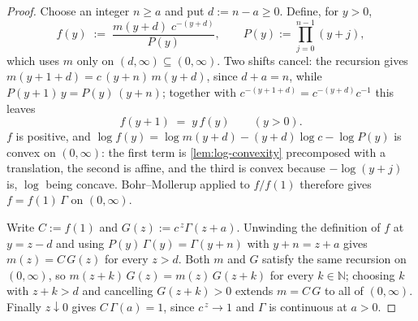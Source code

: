 \begin{proof}
\leanok
Choose an integer $n \ge a$ and put $d := n - a \ge 0$. Define, for $y > 0$,
\[
  f(y) \;:=\; \frac{m(y + d)\; c^{-(y+d)}}{P(y)},
  \qquad P(y) := \prod_{j=0}^{n-1}(y + j),
\]
which uses $m$ only on $(d, \infty) \subseteq (0,\infty)$. Two shifts cancel: the recursion gives
$m(y + 1 + d) = c\,(y + n)\,m(y+d)$, since $d + a = n$, while $P(y+1)\,y = P(y)\,(y+n)$; together
with $c^{-(y+1+d)} = c^{-(y+d)}c^{-1}$ this leaves
\[
  f(y+1) \;=\; y\,f(y) \qquad (y > 0).
\]
$f$ is positive, and $\log f(y) = \log m(y+d) - (y+d)\log c - \log P(y)$ is convex on $(0,\infty)$:
the first term is \ref{lem:log-convexity} precomposed with a translation, the second is affine, and
the third is convex because $-\log(y+j)$ is, $\log$ being concave. Bohr--Mollerup applied to
$f/f(1)$ therefore gives $f = f(1)\,\Gamma$ on $(0,\infty)$.

Write $C := f(1)$ and $G(z) := c^{\,z}\Gamma(z+a)$. Unwinding the definition of $f$ at
$y = z - d$ and using $P(y)\,\Gamma(y) = \Gamma(y+n)$ with $y + n = z + a$ gives $m(z) = C\,G(z)$
for every $z > d$. Both $m$ and $G$ satisfy the same recursion on $(0,\infty)$, so
$m(z + k)\,G(z) = m(z)\,G(z+k)$ for every $k \in \mathbb{N}$; choosing $k$ with $z + k > d$ and
cancelling $G(z+k) > 0$ extends $m = C\,G$ to all of $(0,\infty)$. Finally $z \downarrow 0$ gives
$C\,\Gamma(a) = 1$, since $c^{\,z} \to 1$ and $\Gamma$ is continuous at $a > 0$.
\end{proof}


